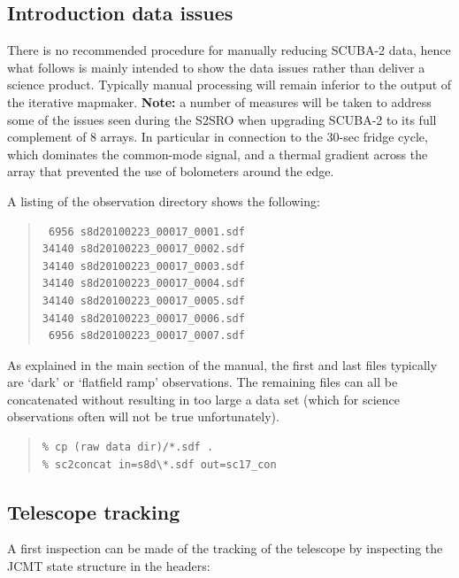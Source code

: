 \documentclass[twoside,11pt]{article}
\newcommand{\xlabel}[1]{}
\renewcommand{\_}{\texttt{\symbol{95}}}
\newenvironment{myquote}{\begin{quote}\begin{small}}{\end{small}\end{quote}}
\begin{document}
\subsection{\xlabel{intro2}Introduction data issues}
\label{sec:intro2}

There is no recommended procedure for manually reducing SCUBA-2 data,
hence what follows is mainly intended to show the data issues rather
than deliver a science product. Typically manual processing will
remain inferior to the output of the iterative mapmaker. \textbf{Note:}
a number of measures will be taken to address some of the issues seen
during the S2SRO when upgrading SCUBA-2 to its full complement of 8
arrays. In particular in connection to the 30-sec fridge cycle, which
dominates the common-mode signal, and a thermal gradient across the
array that prevented the use of bolometers around the edge.

A listing of the observation directory shows the following:

\begin{myquote}
\begin{verbatim}
 6956 s8d20100223_00017_0001.sdf
34140 s8d20100223_00017_0002.sdf
34140 s8d20100223_00017_0003.sdf
34140 s8d20100223_00017_0004.sdf
34140 s8d20100223_00017_0005.sdf
34140 s8d20100223_00017_0006.sdf
 6956 s8d20100223_00017_0007.sdf
\end{verbatim}
\end{myquote}

As explained in the main section of the manual, the first and last
files typically are `dark' or `flatfield ramp' observations. The
remaining files can all be concatenated without resulting in too large
a data set (which for science observations often will not be true
unfortunately).

\begin{myquote}
\begin{verbatim}
% cp (raw data dir)/*.sdf .
% sc2concat in=s8d\*.sdf out=sc17_con
\end{verbatim}
\end{myquote}

\subsection{\xlabel{Tracking}Telescope tracking}
\label{sec:tracking}

A first inspection can be made of the tracking of the telescope by
inspecting the JCMT state structure in the headers:
\end{document}
